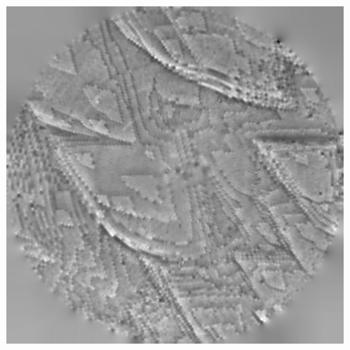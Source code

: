 \begin{figure}[!ht]
\endminipage\hfill
{}%
  	\includegraphics[width=\linewidth]{images/006_X10s50l10m_MOv2_290.png}
\endminipage

\end{figure}


